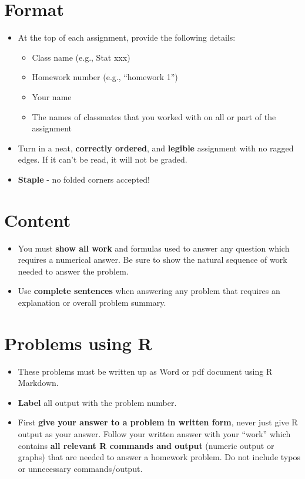 \documentclass[
]{book}
\providecommand{\tightlist}{%
  \setlength{\itemsep}{0pt}\setlength{\parskip}{0pt}}
\begin{document}
\hypertarget{format}{%
\section{Format}\label{format}}

\begin{itemize}
\tightlist
\item
  At the top of each assignment, provide the following details:

  \begin{itemize}
  \tightlist
  \item
    Class name (e.g., Stat xxx)
  \item
    Homework number (e.g., ``homework 1'')
  \item
    Your name
  \item
    The names of classmates that you worked with on all or part of the assignment
  \end{itemize}
\item
  Turn in a neat, \textbf{correctly ordered}, and \textbf{legible} assignment with no ragged edges. If it can't be read, it will not be graded.
\item
  \textbf{Staple} - no folded corners accepted!
\end{itemize}

\hypertarget{content}{%
\section{Content}\label{content}}

\begin{itemize}
\tightlist
\item
  You must \textbf{show all work} and formulas used to answer any question which requires a numerical answer. Be sure to show the natural sequence of work needed to answer the problem.
\item
  Use \textbf{complete sentences} when answering any problem that requires an explanation or overall problem summary.
\end{itemize}

\hypertarget{problems-using-r}{%
\section{Problems using R}\label{problems-using-r}}

\begin{itemize}
\tightlist
\item
  These problems must be written up as Word or pdf document using R Markdown.
\item
  \textbf{Label} all output with the problem number.
\item
  First \textbf{give your answer to a problem in written form}, never just give R output as your answer. Follow your written answer with your ``work'' which contains \textbf{all relevant R commands and output} (numeric output or graphs) that are needed to answer a homework problem. Do not include typos or unnecessary commands/output.
\end{itemize}
\end{document}
